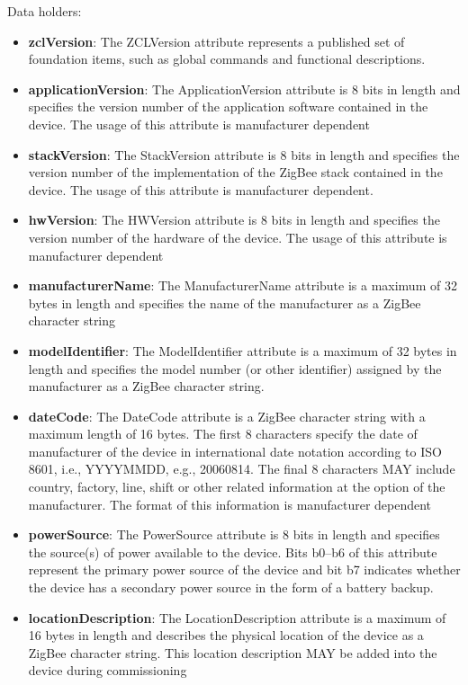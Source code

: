 \noindent
Data holders:

\begin{itemize}
\item \textbf{zclVersion}: The ZCLVersion attribute represents a published set of foundation items, such as global commands and functional descriptions.
\item \textbf{applicationVersion}: The ApplicationVersion attribute is 8 bits in length and specifies the version number of the application software contained in the device. The usage of this attribute is manufacturer dependent
\item \textbf{stackVersion}: The StackVersion attribute is 8 bits in length and specifies the version number of the implementation of the ZigBee stack contained in the device. The usage of this attribute is manufacturer dependent.
\item \textbf{hwVersion}: The HWVersion attribute is 8 bits in length and specifies the version number of the hardware of the device. The usage of this attribute is manufacturer dependent
\item \textbf{manufacturerName}: The ManufacturerName attribute is a maximum of 32 bytes in length and specifies the name of the manufacturer as a ZigBee character string
\item \textbf{modelIdentifier}: The ModelIdentifier attribute is a maximum of 32 bytes in length and specifies the model number (or other identifier) assigned by the manufacturer as a ZigBee character string.
\item \textbf{dateCode}: The DateCode attribute is a ZigBee character string with a maximum length of 16 bytes. The first 8 characters specify the date of manufacturer of the device in international date notation according to ISO 8601, i.e., YYYYMMDD, e.g., 20060814. The final 8 characters MAY include country, factory, line, shift or other related information at the option of the manufacturer. The format of this information is manufacturer dependent
\item \textbf{powerSource}: The PowerSource attribute is 8 bits in length and specifies the source(s) of power available to the device. Bits b0–b6 of this attribute represent the primary power source of the device and bit b7 indicates whether the device has a secondary power source in the form of a battery backup.
\item \textbf{locationDescription}: The LocationDescription attribute is a maximum of 16 bytes in length and describes the physical location of the device as a ZigBee character string. This location description MAY be added into the device during commissioning

\end{itemize}
